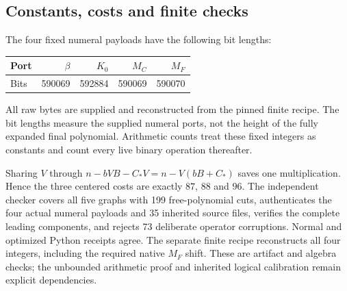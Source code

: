 \subsection{Constants, costs and finite checks}

The four fixed numeral payloads have the following bit lengths:
\begin{center}
\begin{tabular}{lrrrr}
\toprule
Port &$\beta$&$K_0$&$M_C$&$M_F$\\
\midrule
Bits&590069&592884&590069&590070\\
\bottomrule
\end{tabular}
\end{center}
All raw bytes are supplied and reconstructed from the pinned finite recipe.
The bit lengths measure the supplied numeral ports, not the height of the
fully expanded final polynomial. Arithmetic counts treat these fixed
integers as constants and count every live binary operation thereafter.

Sharing $V$ through
$n-bVB-C_*V=n-V(bB+C_*)$ saves one multiplication. Hence the three
centered costs are exactly $87$, $88$ and $96$. The independent checker
covers all five graphs with 199 free-polynomial cuts, authenticates the
four actual numeral payloads and 35 inherited source files, verifies the
complete leading components, and rejects 73 deliberate operator
corruptions. Normal and optimized Python receipts agree. The separate
finite recipe reconstructs all four integers, including the required native
$M_F$ shift. These are artifact and algebra checks; the unbounded arithmetic
proof and inherited logical calibration remain explicit dependencies.
